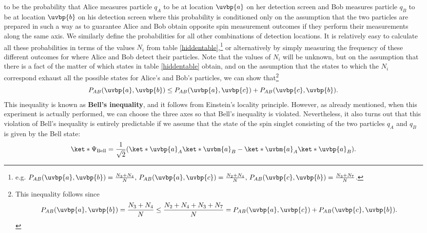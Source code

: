 \documentclass[12pt]{report}
\begin{document}
to be the probability that Alice measures particle $q_A$ to be at location $\uvbp{a}$ on her detection screen and Bob measures particle $q_B$ to be at location $\uvbp{b}$ on his detection screen where this probability is conditioned only on the assumption that the two particles are prepared in such a way as to guarantee Alice and Bob obtain opposite spin measurement outcomes if they perform their measurements along the same axis. We similarly define the probabilities for all other combinations of detection locations. It is relatively easy to calculate all these probabilities in terms of the values $N_i$ from table \ref{hiddentable},\footnote{e.g.  $P_{AB}(\uvbp{a},\uvbp{b})=\frac{N_3+N_4}{N},\, P_{AB}(\uvbp{a},\uvbp{c})=\frac{N_2+N_4}{N},\,P_{AB}(\uvbp{c},\uvbp{b})=\frac{N_3+N_7}{N}$.  } or alternatively by simply measuring the frequency of these different outcomes for where Alice and Bob detect their particles. Note that the values of $N_i$ will be unknown, but on the assumption that there is a fact of the matter of which states in table \ref{hiddentable} obtain, and on the assumption that the states to which the $N_i$ correspond exhaust all the possible states for Alice's and Bob's particles, we can show that\footnote{This inequality follows since 
$$P_{AB}(\uvbp{a},\uvbp{b})=\frac{N_3+N_4}{N}\leq \frac{N_2+N_4+N_3+N_7}{N}=P_{AB}(\uvbp{a},\uvbp{c})+P_{AB}(\uvbp{c},\uvbp{b}).$$}
       \begin{equation}\label{bellinequality}
      P_{AB}(\uvbp{a},\uvbp{b})\leq P_{AB}(\uvbp{a},\uvbp{c})+P_{AB}(\uvbp{c},\uvbp{b}).
      \end{equation}
This inequality is known as \textbf{Bell's inequality}, and it follows from Einstein's locality principle.  However, as already mentioned, when this experiment is actually performed, we can choose the three axes so that Bell's inequality is violated. Nevertheless,  it also turns out that this violation of Bell's inequality is entirely predictable if we assume that the state of the spin singlet consisting of the two particles $q_A$ and $q_B$ is given by the Bell state: 
    \begin{equation}
      \ket*{\Psi_{\text{Bell}}}=\frac{1}{\sqrt{2}}(\ket*{\uvbp{a}}_A\ket*{\uvbm{a}}_B-\ket*{\uvbm{a}}_A\ket*{\uvbp{a}}_B).
    \end{equation}
      
\end{document}
